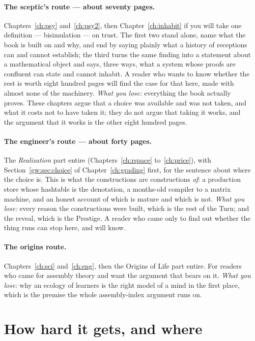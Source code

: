 \paragraph{The sceptic's route --- about seventy pages.}
Chapters~\ref{ch:psy} and~\ref{ch:psy2}, then Chapter~\ref{ch:inhabit}
if you will take one definition --- bisimulation --- on trust.
The first two stand alone, name what the book is built on and why, and
end by saying plainly what a history of receptions can and cannot
establish; the third turns the same finding into a statement about a
mathematical object and says, three ways, what a system whose proofs are
confluent can state and cannot inhabit.
A reader who wants to know whether the rest is worth eight hundred
pages will find the case for that here, made with almost none of the
machinery.
\emph{What you lose:} everything the book actually proves.
These chapters argue that a choice was available and was not taken,
and what it costs not to have taken it; they do not argue that taking
it works, and the argument that it works is the other eight hundred
pages.

\paragraph{The engineer's route --- about forty pages.}
The \emph{Realization} part entire (Chapters~\ref{ch:rspace}
to~\ref{ch:price}), with Section~\ref{gw:sec:choice} of
Chapter~\ref{ch:grading} first, for the sentence about where the choice
is.
This is what the constructions are constructions \emph{of}: a
production store whose hashtable is the denotation, a months-old
compiler to a matrix machine, and an honest account of which is mature
and which is not.
\emph{What you lose:} every reason the constructions were built, which
is the rest of the Turn; and the reveal, which is the Prestige.
A reader who came only to find out whether the thing runs can stop
here, and will know.

\paragraph{The origins route.}
Chapters~\ref{ch:sci} and~\ref{ch:eng}, then the Origins of Life
part entire.
For readers who came for assembly theory and want the argument that
bears on it.
\emph{What you lose:} why an ecology of learners is the right model
of a mind in the first place, which is the premise the whole
assembly-index argument runs on.

\section*{How hard it gets, and where}

